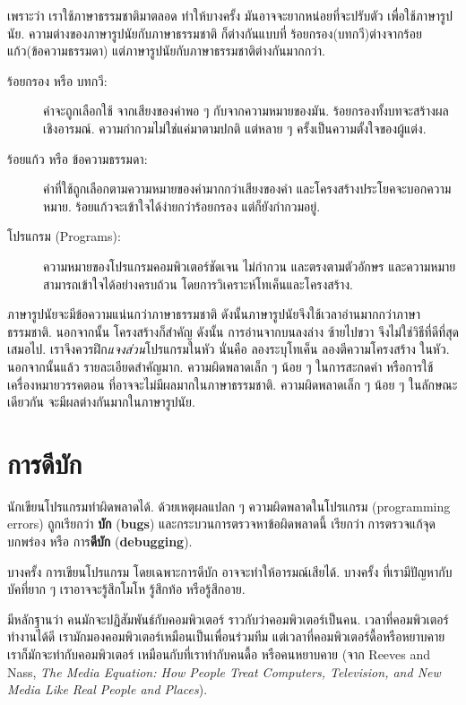 เพราะว่า เราใช้ภาษาธรรมชาติมาตลอด
ทำให้บางครั้ง มันอาจจะยากหน่อยที่จะปรับตัว เพื่อใช้ภาษารูปนัย.
ความต่างของภาษารูปนัยกับภาษาธรรมชาติ 
ก็ต่างกันแบบที่ ร้อยกรอง(บทกวี)ต่างจากร้อยแก้ว(ข้อความธรรมดา)
แต่ภาษารูปนัยกับภาษาธรรมชาติต่างกันมากกว่า.
 

\begin{description}

\item[ร้อยกรอง หรือ บทกวี:] 
คำจะถูกเลือกใช้ จากเสียงของคำพอ ๆ กับจากความหมายของมัน.
ร้อยกรองทั้งบทจะสร้างผลเชิงอารมณ์.
ความกำกวมไม่ใช่แค่มาตามปกติ แต่หลาย ๆ ครั้งเป็นความตั้งใจของผู้แต่ง.

\item[ร้อยแก้ว หรือ ข้อความธรรมดา:] 
คำที่ใช้ถูกเลือกตามความหมายของคำมากกว่าเสียงของคำ
และโครงสร้างประโยคจะบอกความหมาย.
ร้อยแก้วจะเข้าใจได้ง่ายกว่าร้อยกรอง แต่ก็ยังกำกวมอยู่.

\item[โปรแกรม (Programs):] 
ความหมายของโปรแกรมคอมพิวเตอร์ชัดเจน ไม่กำกวน และตรงตามตัวอักษร 
และความหมายสามารถเข้าใจได้อย่างครบถ้วน
โดยการวิเคราะห์โทเค็นและโครงสร้าง.

\end{description}

ภาษารูปนัยจะมีข้อความแน่นกว่าภาษาธรรมชาติ
ดังนั้นภาษารูปนัยจึงใช้เวลาอ่านมากกว่าภาษาธรรมชาติ.
นอกจากนั้น โครงสร้างก็สำคัญ
ดังนั้น การอ่านจากบนลงล่าง ซ้ายไปขวา จึงไม่ใช่วิธีที่ดีที่สุดเสมอไป.
เราจึงควรฝึก\textit{แจงส่วน}โปรแกรมในหัว
นั่นคือ ลองระบุโทเค็น ลองตีความโครงสร้าง ในหัว.
นอกจากนั้นแล้ว รายละเอียดสำคัญมาก.
ความผิดพลาดเล็ก ๆ น้อย ๆ ในการสะกดคำ หรือการใช้เครื่องหมายวรรคตอน ที่อาจจะไม่มีผลมากในภาษาธรรมชาติ.
ความผิดพลาดเล็ก ๆ น้อย ๆ ในลักษณะเดียวกัน จะมีผลต่างกันมากในภาษารูปนัย.

\section{การดีบัก}

นักเขียนโปรแกรมทำผิดพลาดได้.
ด้วยเหตุผลแปลก	 ๆ ความผิดพลาดในโปรแกรม (programming errors) ถูกเรียกว่า \textbf{บัก} (\textbf{bugs})
และกระบวนการตรวจหาข้อผิดพลาดนี้ เรียกว่า
การตรวจแก้จุดบกพร่อง หรือ การ\textbf{ดีบัก} (\textbf{debugging}).

บางครั้ง การเขียนโปรแกรม โดยเฉพาะการดีบัก อาจจะทำให้อารมณ์เสียได้.
บางครั้ง ที่เรามีปัญหากับบัคที่ยาก ๆ
เราอาจจะรู้สึกโมโห รู้สึกท้อ หรือรู้สึกอาย.

มีหลักฐานว่า คนมักจะปฏิสัมพันธ์กับคอมพิวเตอร์ ราวกับว่าคอมพิวเตอร์เป็นคน.
เวลาที่คอมพิวเตอร์ทำงานได้ดี เรามักมองคอมพิวเตอร์เหมือนเป็นเพื่อนร่วมทีม
แต่เวลาที่คอมพิวเตอร์ดื้อหรือหยาบคาย 
เราก็มักจะทำกับคอมพิวเตอร์ เหมือนกับที่เราทำกับคนดื้อ หรือคนหยาบคาย (จาก Reeves and Nass, \textit{The Media
    Equation: How People Treat Computers, Television, and New Media
    Like Real People and Places}).

